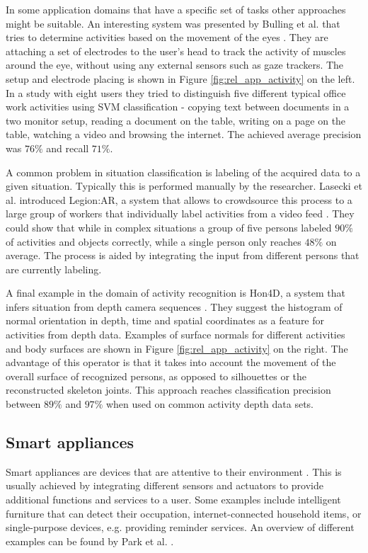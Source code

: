 In some application domains that have a specific set of tasks other approaches might be suitable. An interesting system was presented by Bulling et al. that tries to determine activities based on the movement of the eyes \cite{bulling2011eye}. They are attaching a set of electrodes to the user's head to track the activity of muscles around the eye, without using any external sensors such as gaze trackers. The setup and electrode placing is shown in Figure \ref{fig:rel_app_activity} on the left. In a study with eight users they tried to distinguish five different typical office work activities using SVM classification - copying text between documents in a two monitor setup, reading a document on the table, writing on a page on the table, watching a video and browsing the internet. The achieved average precision was $76\%$ and recall $71\%$.

A common problem in situation classification is labeling of the acquired data to a given situation. Typically this is performed manually by the researcher. Lasecki et al. introduced Legion:AR, a system that allows to crowdsource this process to a large group of workers that individually label activities from a video feed \cite{lasecki2013real}. They could show that while in complex situations a group of five persons labeled $90\%$ of activities and objects correctly, while a single person only reaches $48\%$ on average. The process is aided by integrating the input from different persons that are currently labeling.

A final example in the domain of activity recognition is Hon4D, a system that infers situation from depth camera sequences \cite{oreifej2013hon4d}. They suggest the histogram of normal orientation in depth, time and spatial coordinates as a feature for activities from depth data. Examples of surface normals for different activities and body surfaces are shown in Figure \ref{fig:rel_app_activity} on the right. The advantage of this operator is that it takes into account the movement of the overall surface of recognized persons, as opposed to silhouettes or the reconstructed skeleton joints. This approach reaches classification precision between $89\%$ and $97\%$ when used on common activity depth data sets. 

\subsection{Smart appliances}
Smart appliances are devices that are attentive to their environment \cite{schmidt2001build}. This is usually achieved by integrating different sensors and actuators to provide additional functions and services to a user. Some examples include intelligent furniture that can detect their occupation, internet-connected household items, or single-purpose devices, e.g. providing reminder services. An overview of different examples can be found by Park et al. \cite{park2003smart}. 

